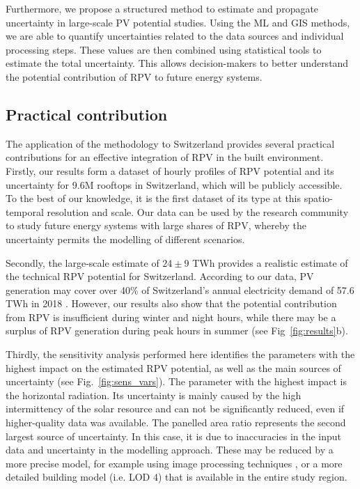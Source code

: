 Furthermore, we propose a structured method to estimate and propagate uncertainty in large-scale PV potential studies. Using the ML and GIS methods, we are able to quantify uncertainties related to the data sources and individual processing steps. These values are then combined using statistical tools to estimate the total uncertainty.
This allows decision-makers to better understand the potential contribution of RPV to future energy systems. 


\subsection{Practical contribution}

The application of the methodology to Switzerland provides several practical contributions for an effective integration of RPV in the built environment. 
Firstly, our results form a dataset of hourly profiles of RPV potential and its uncertainty for 9.6M rooftops in Switzerland, which will be publicly accessible. To the best of our knowledge, it is the first dataset of its type at this spatio-temporal resolution and scale. Our data can be used by the research community to study future energy systems with large shares of RPV, whereby the uncertainty permits the modelling of different scenarios. 

Secondly, the large-scale estimate of $24 \pm 9$ TWh provides a realistic estimate of the technical RPV potential for Switzerland. According to our data, PV generation may cover over 40\% of Switzerland's annual electricity demand of 57.6 TWh in 2018 \cite{swiss_federal_institue_for_energy_schweizerische_2018}. However, our results also show that the potential contribution from RPV is insufficient during winter and night hours, while there may be a surplus of RPV generation during peak hours in summer (see Fig~\ref{fig:results}b). 

Thirdly, the sensitivity analysis performed here identifies the parameters with the highest impact on the estimated RPV potential, as well as the main sources of uncertainty (see Fig.~\ref{fig:sens_vars}). The parameter with the highest impact is the horizontal radiation. Its uncertainty is mainly caused by the high intermittency of the solar resource and can not be significantly reduced, even if higher-quality data was available. 
The panelled area ratio represents the second largest source of uncertainty. In this case, it is due to inaccuracies in the input data and uncertainty in the modelling approach. These may be reduced by a more precise model, for example using image processing techniques \cite{mainzer_assessment_2017}, or a more detailed building model (i.e. LOD 4) that is available in the entire study region.


